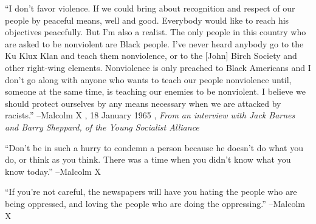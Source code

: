 \documentclass{article}%
\begin{document}
\linebreak%
\vspace{1mm}%
\begin{minipage}{\textwidth}%
\flushleft%
“I don't favor violence. If we could bring about recognition and respect of our people by peaceful means, well and good. Everybody would like to reach his objectives peacefully. But I'm also a realist. The only people in this country who are asked to be nonviolent are Black people. I've never heard anybody go to the Ku Klux Klan and teach them nonviolence, or to the {[}John{]} Birch Society and other right{-}wing elements. Nonviolence is only preached to Black Americans and I don't go along with anyone who wants to teach our people nonviolence until, someone at the same time, is teaching our enemies to be nonviolent. I believe we should protect ourselves by any means necessary when we are attacked by racists.”%
\linebreak%
\vspace{1mm}%
–Malcolm X%
, 18 January 1965%
, \textit{From an interview with Jack Barnes and Barry Sheppard, of the Young Socialist Alliance}%
\linebreak%
\vspace{1mm}%
\end{minipage}%
\linebreak%
\vspace{1mm}%
\begin{minipage}{\textwidth}%
\flushleft%
“Don't be in such a hurry to condemn a person because he doesn't do what you do, or think as you think. There was a time when you didn't know what you know today.”%
\linebreak%
\vspace{1mm}%
–Malcolm X%
\linebreak%
\vspace{1mm}%
\end{minipage}%
\linebreak%
\vspace{1mm}%
\begin{minipage}{\textwidth}%
\flushleft%
“If you're not careful, the newspapers will have you hating the people who are being oppressed, and loving the people who are doing the oppressing.”%
\linebreak%
\vspace{1mm}%
–Malcolm X%
\linebreak%
\vspace{1mm}%
\end{minipage}%
\linebreak%
\end{document}
